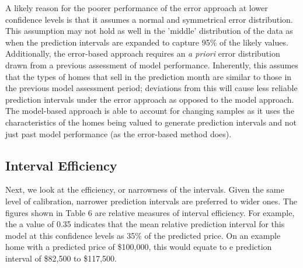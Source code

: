 \documentclass[colTwo]{anon}
\theoremstyle{definition}
\begin{document}
A likely reason for the poorer performance of the error approach at lower confidence levels is that it assumes a normal and symmetrical error distribution. This assumption may not hold as well in the 'middle' distribution of the data as when the prediction intervals are expanded to capture 95\% of the likely values. Additionally, the error-based approach requires an \textit{a priori} error distribution drawn from a previous assessment of model performance.  Inherently, this assumes that the types of homes that sell in the prediction month are similar to those in the previous model assessment period; deviations from this will cause less reliable prediction intervals under the error approach as opposed to the model approach.  The model-based approach is able to account for changing samples as it uses the characteristics of the homes being valued to generate prediction intervals and not just past model performance (as the error-based method does). 
\subsection{Interval Efficiency}

Next, we look at the efficiency, or narrowness of the intervals.  Given the same level of calibration, narrower prediction intervals are preferred to wider ones. The figures shown in Table 6 are relative measures of interval efficiency.  For example, the a value of 0.35 indicates that the mean relative prediction interval for this model at this confidence levels as 35\% of the predicted price. On an example home with a predicted price of \$100,000, this would equate to e prediction interval of \$82,500 to \$117,500.
\end{document}
